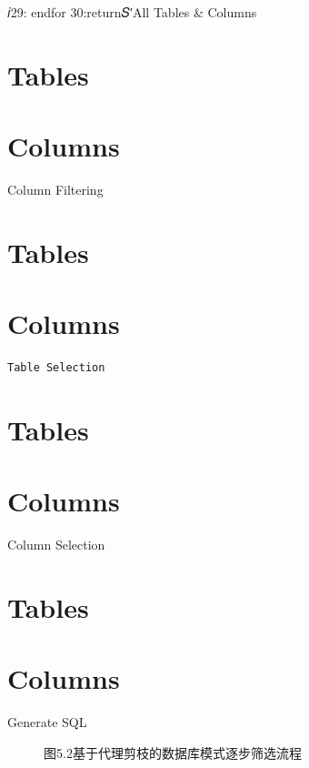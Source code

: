 \documentclass[12pt,a4paper,openright,UTF8]{ctexbook}
\begin{document}
𝑖29: endfor 30:return𝑆′All Tables \& Columns

\chapter{Tables}


\chapter{Columns}

Column Filtering

\chapter{Tables}


\chapter{Columns}


\begin{lstlisting}
Table Selection
\end{lstlisting}


\chapter{Tables}


\chapter{Columns}

Column Selection

\chapter{Tables}


\chapter{Columns}

Generate SQL

\begin{figure}[htbp]
\centering
{}
\caption{图5.2基于代理剪枝的数据库模式逐步筛选流程}
\end{figure}
\end{document}
